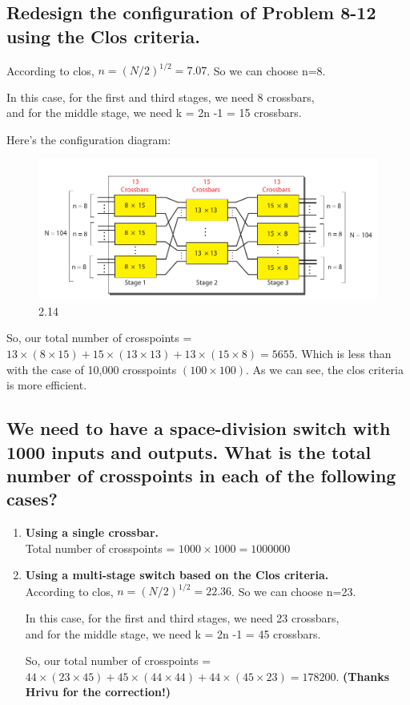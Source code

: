 \documentclass{article}
\begin{document}
\subsection{Redesign the configuration of Problem 8-12 using the Clos criteria.}
According to clos, $ n = (N / 2)^{1/2} = 7.07 $. So we can choose n=8. \par
In this case, for the first and third stages, we need 8 crossbars,\\
and for the middle stage, we need k = 2n -1 = 15 crossbars. \par
Here's the configuration diagram:
\begin{figure}[H]
	\center
	\includegraphics[scale=0.5]{8.3.png}
	\caption{2.14}
\end{figure}

So, our total number of crosspoints = $ 13 \times (8 \times 15) + 15 \times (13 \times 13) + 13 \times (15 \times 8) = 5655 $.
Which is less than with the case of 10,000 crosspoints $ (100 \times 100) $. As we can see, the clos criteria is more efficient.

\subsection{We need to have a space-division switch with 1000 inputs and outputs. What
	is the total number of crosspoints in each of the following cases?}
\begin{enumerate}
	\item \textbf{ Using a single crossbar. } \\
	      Total number of crosspoints = $ 1000 \times 1000 = 1000000 $
	\item \textbf{ Using a multi-stage switch based on the Clos criteria. } \\
	      According to clos, $ n = (N / 2)^{1/2} = 22.36 $. So we can choose n=23. \par
	      In this case, for the first and third stages, we need 23 crossbars,\\
	      and for the middle stage, we need k = 2n -1 = 45 crossbars. \par
	      So, our total number of crosspoints = $ 44 \times (23 \times 45) + 45 \times (44 \times 44) + 44 \times (45 \times 23) = 178200 $. \textbf{(Thanks Hrivu for the correction!)}
\end{enumerate}
\end{document}
